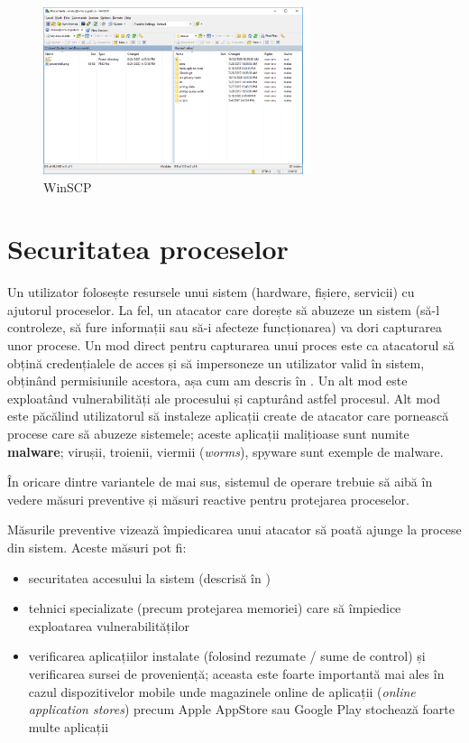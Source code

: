 \begin{figure}[!htbp]
  \centering
  \includegraphics[width=0.7\textwidth]{chapters/12-sec/img/winscp.png}
  \caption{WinSCP}
  \label{fig:sec:winscp}
\end{figure}

\section{Securitatea proceselor}
\label{sec:sec:process}

Un utilizator folosește resursele unui sistem (hardware, fișiere, servicii) cu ajutorul proceselor. La fel, un atacator care dorește să abuzeze un sistem (să-l controleze, să fure informații sau să-i afecteze funcționarea) va dori capturarea unor procese. Un mod direct pentru capturarea unui proces este ca atacatorul să obțină credențialele de acces și să impersoneze un utilizator valid în sistem, obținând permisiunile acestora, așa cum am descris în . Un alt mod este exploatând vulnerabilități ale procesului și capturând astfel procesul. Alt mod este păcălind utilizatorul să instaleze aplicații create de atacator care pornească procese care să abuzeze sistemele; aceste aplicații malițioase sunt numite \textbf{malware}; virușii, troienii, viermii (\textit{worms}), spyware sunt exemple de malware.

În oricare dintre variantele de mai sus, sistemul de operare trebuie să aibă în vedere măsuri preventive și măsuri reactive pentru protejarea proceselor.

Măsurile preventive vizează împiedicarea unui atacator să poată ajunge la procese din sistem. Aceste măsuri pot fi:

\begin{itemize}
  \item securitatea accesului la sistem (descrisă în )
  \item tehnici specializate (precum protejarea memoriei) care să împiedice exploatarea vulnerabilităților
  \item verificarea aplicațiilor instalate (folosind rezumate / sume de control) și verificarea sursei de proveniență; aceasta este foarte importantă mai ales în cazul dispozitivelor mobile unde magazinele online de aplicații (\textit{online application stores}) precum Apple AppStore sau Google Play stochează foarte multe aplicații
\end{itemize}

